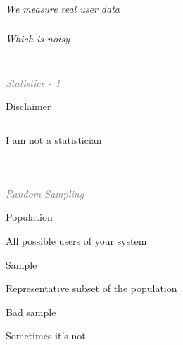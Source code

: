 \documentclass{beamer}
\newcommand{\innersplash}[1]{
  \begin{center}
    \Large \textrm{\textit{ #1 } }
  \end{center}
}
\newcommand{\splashslide}[2][{}]{
  \begin{frame}
  \frametitle{#1}
  \innersplash{#2}
  \end{frame}
}
\newcommand{\leadinslide}[2]{
  \splashslide{
     {\fontsize{150}{20}\selectfont{\raisebox{0pt}[90pt][0pt]{\textcolor{light-gray}{#1}}}} \\ \huge \textcolor{gray}{#2}
  }
}
\begin{document}
\splashslide{We measure real user data}

\splashslide{Which is noisy}

\leadinslide{1}{Statistics - 1}

\begin{frame}{Disclaimer}
  \begin{columns}[t]
  \begin{center}
  \Large{I am not a statistician}
  \end{center}
  \end{columns}  
\end{frame}

\leadinslide{1-1}{Random Sampling}

\begin{frame}{Population}
  \begin{block}{}
  \begin{center}
  All possible users of your system
  \end{center}
  \end{block}
  \parbox[c][0.4\paperheight]{\paperwidth}{ }
\end{frame}

\begin{frame}{Sample}
  \begin{block}{}
  \begin{center}
  Representative subset of the population
  \end{center}
  \end{block}
  \parbox[c][0.4\paperheight]{\paperwidth}{ }
\end{frame}

\begin{frame}{Bad sample}
  \begin{block}{}
  \begin{center}
  Sometimes it's not
  \end{center}
  \end{block}
  \parbox[c][0.4\paperheight]{\paperwidth}{ }
\end{frame}
\end{document}
